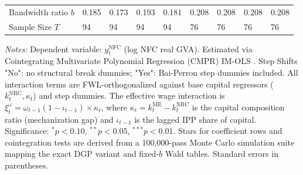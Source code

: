\begin{table}[h!]
\begin{tabular}{p{3.0cm}p{1.25cm}p{1.25cm}p{1.25cm}p{1.25cm}p{1.5cm}p{1.5cm}p{1.5cm}p{1.5cm}}
		Bandwidth ratio $b$ & 0.185 & 0.173 & 0.193 & 0.181 & 0.208 & 0.208 & 0.208 & 0.208 \\
		Sample Size $T$ & 94 & 94 & 94 & 94 & 76 & 76 & 76 & 76 \\
		\bottomrule
	\end{tabular}
	\begin{minipage}{\textwidth}
		\scriptsize
		\textit{Notes:} Dependent variable: $y_t^{\text{NFC}}$ (log NFC real GVA). Estimated via Cointegrating Multivariate Polynomial Regression (CMPR) IM-OLS \citep{VogelsangWagner2024}. Step Shifts "No": no structural break dummies; "Yes": Bai-Perron step dummies included. All interaction terms are FWL-orthogonalized against base capital regressors ($k^{\text{NRC}}_t, \kappa_t$) and step dummies. The effective wage interaction is $\xi^\omega_t = \omega_{t-1}(1-\iota_{t-1}) \times \kappa_t$, where $\kappa_t = k^{\text{ME}}_t - k^{\text{NRC}}_t$ is the capital composition ratio (mechanization gap) and $\iota_{t-1}$ is the lagged IPP share of capital. Significance: $^*p<0.10$, $^{**}p<0.05$, $^{***}p<0.01$. Stars for coefficient rows and cointegration tests are derived from a 100,000-pass Monte Carlo simulation suite mapping the exact DGP variant and fixed-$b$ Wald tables. Standard errors in parentheses.
	\end{minipage}
\end{table}
